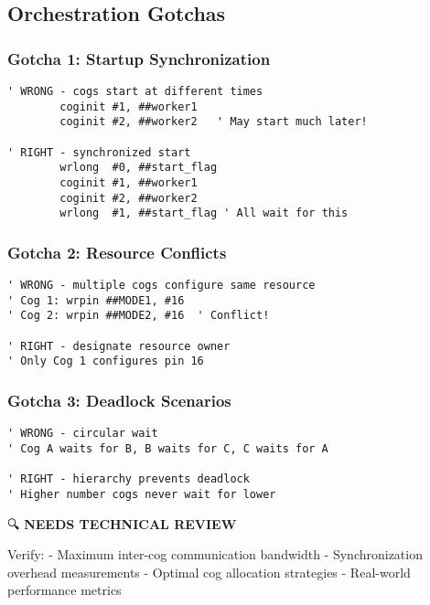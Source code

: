 \documentclass[11pt]{book}
\begin{document}
\hypertarget{orchestration-gotchas}{%
\subsection{Orchestration Gotchas}\label{orchestration-gotchas}}

\hypertarget{gotcha-1-startup-synchronization}{%
\subsubsection{Gotcha 1: Startup
Synchronization}\label{gotcha-1-startup-synchronization}}

\begin{lstlisting}
' WRONG - cogs start at different times
        coginit #1, ##worker1
        coginit #2, ##worker2   ' May start much later!
        
' RIGHT - synchronized start
        wrlong  #0, ##start_flag
        coginit #1, ##worker1
        coginit #2, ##worker2
        wrlong  #1, ##start_flag ' All wait for this
\end{lstlisting}

\hypertarget{gotcha-2-resource-conflicts}{%
\subsubsection{Gotcha 2: Resource
Conflicts}\label{gotcha-2-resource-conflicts}}

\begin{lstlisting}
' WRONG - multiple cogs configure same resource
' Cog 1: wrpin ##MODE1, #16
' Cog 2: wrpin ##MODE2, #16  ' Conflict!

' RIGHT - designate resource owner
' Only Cog 1 configures pin 16
\end{lstlisting}

\hypertarget{gotcha-3-deadlock-scenarios}{%
\subsubsection{Gotcha 3: Deadlock
Scenarios}\label{gotcha-3-deadlock-scenarios}}

\begin{lstlisting}
' WRONG - circular wait
' Cog A waits for B, B waits for C, C waits for A

' RIGHT - hierarchy prevents deadlock
' Higher number cogs never wait for lower
\end{lstlisting}

\begin{review}
🔍 \textbf{NEEDS TECHNICAL REVIEW}

Verify:
- Maximum inter-cog communication bandwidth
- Synchronization overhead measurements
- Optimal cog allocation strategies
- Real-world performance metrics
\end{review}
\end{document}
